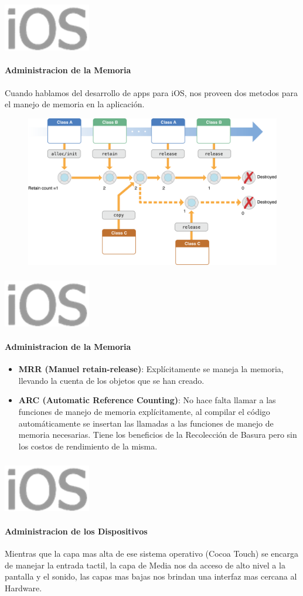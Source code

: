 \documentclass{beamer}
\newcommand*{\ioslogo}{\includegraphics[scale=0.25]{img/logo2.png} \ }%
\begin{document}
\begin{frame}
\frametitle{\ioslogo}
\framesubtitle{Administracion de la Memoria}
	
	Cuando hablamos del desarrollo de apps para iOS, nos proveen dos metodos para el manejo de memoria en la aplicación.
	
	\begin{figure}[h]
		\centering
		\includegraphics[scale=0.2]{img/memory_management.png}
	\end{figure}	
\end{frame}

\begin{frame}
\frametitle{\ioslogo}
\framesubtitle{Administracion de la Memoria}
	\begin{itemize}
		\item \textbf{MRR (Manuel retain-release)}: Explícitamente se maneja la memoria, llevando la cuenta de los objetos que se han creado.
		
		\item \textbf{ARC (Automatic Reference Counting)}: No hace falta llamar a las funciones de manejo de memoria explícitamente, al compilar el código automáticamente se insertan las llamadas a las funciones de manejo de memoria necesarias. Tiene los beneficios de la Recolección de Basura pero sin los costos de rendimiento de la misma.
	\end{itemize}
\end{frame}


\begin{frame}
	\frametitle{\ioslogo}
	\framesubtitle{Administracion de los Dispositivos}
	
	Mientras que la capa mas alta de ese sistema operativo (Cocoa Touch) se encarga de manejar la entrada tactil, la capa de Media nos da acceso de alto nivel a la pantalla y el sonido, las capas mas bajas nos brindan una interfaz mas cercana al Hardware.
\end{frame}
\end{document}
